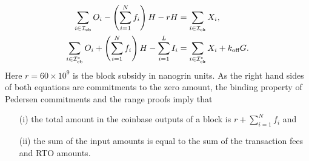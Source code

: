 \begin{align}
  \sum_{i \in \mathcal{I}_{\text{cb}}} O_i - \left(\sum_{i=1}^{N}f_i\right)H - r H & = \sum_{i \in \mathcal{I}_{\text{ck}}} X_i,\\
  \sum_{i \in \mathcal{I}_{\text{cb}}^c} O_i + \left(\sum_{i=1}^{N}f_i\right)H - \sum_{i=1}^{L} I_i & = \sum_{i \in \mathcal{I}_{\text{ck}}^c} X_i + k_{\textnormal{off}}G.
  \label{eqn:BlockValidity}
\end{align}
Here $r = 60\times 10^9$ is the block subsidy in nanogrin units.
As the right hand sides of both equations are commitments to the zero amount, the binding property of Pedersen commitments and the range proofs imply that
\begin{enumerate}
  \item[(i)] the total amount in the coinbase outputs of a block is $r + \sum_{i=1}^{N} f_i$ and
  \item [(ii)] the sum of the input amounts is equal to the sum of the transaction fees and RTO amounts.
\end{enumerate}
%


